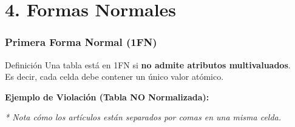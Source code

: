 \documentclass{beamer}
\begin{document}

\section{4. Formas Normales}
\begin{frame}
  \frametitle{Primera Forma Normal (1FN)}

  \begin{alertblock}{Definición}
    Una tabla está en 1FN si \textbf{no admite atributos multivaluados}.
    \\ Es decir, cada celda debe contener un único valor atómico.
  \end{alertblock}

  \vspace{0.5em}
  \textbf{Ejemplo de Violación (Tabla NO Normalizada):}
  \begin{center}
  \end{center}
  \footnotesize{\textit{* Nota cómo los artículos están separados por comas en una misma celda.}}
\end{frame}
\end{document}
